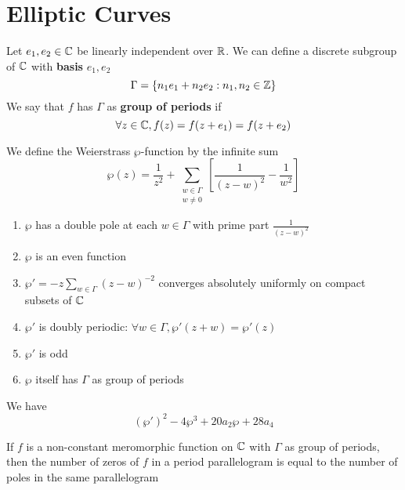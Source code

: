 \documentclass{article}
\begin{document}
\section{Elliptic Curves}

\begin{definition}
  Let \(e_1, e_2 \in \mathbb{C}\) be linearly independent over \(\mathbb{R}\). We can define a discrete subgroup of \(\mathbb{C}\) with \textbf{basis} \(e_1, e_2\)
  \begin{equation}
    \Gamma = \{n_1e_1 + n_2e_2 : n_1, n_2 \in \mathbb{Z}\}
  \end{equation}
  We say that \(f\) has \(\Gamma\) as \textbf{group of periods} if
  \begin{equation}
    \forall z \in \mathbb{C}, f(z) = f(z + e_1) = f(z + e_2)
  \end{equation}
\end{definition}
\begin{definition}
  We define the Weierstrass \(\wp\)-function by the infinite sum
  \begin{equation}\wp(z) = \frac{1}{z^2} + \sum_{\substack{w \in \Gamma \\ w \neq 0}}\left[
    \frac{1}{(z - w)^2} - \frac{1}{w^2}
  \right]\end{equation}
\end{definition}
\begin{claim}
  \begin{enumerate}
    \item \(\wp\) has a double pole at each \(w \in \Gamma\) with prime part \(\frac{1}{(z - w)^2}\)
    \item \(\wp\) is an even function
    \item \(\wp' = -z\sum_{w \in \Gamma}(z - w)^{-2}\) converges absolutely uniformly on compact subsets of \(\mathbb{C}\)
    \item \(\wp'\) is doubly periodic: \(\forall w \in \Gamma, \wp'(z + w) = \wp'(z)\)
    \item \(\wp'\) is odd
    \item \(\wp\) itself has \(\Gamma\) as group of periods
  \end{enumerate}
\end{claim}
We have
\begin{equation}
  (\wp')^2 - 4\wp^3 + 20a_2\wp + 28a_4
\end{equation}

\begin{proposition}
  If \(f\) is a non-constant meromorphic function on \(\mathbb{C}\) with \(\Gamma\) as group of periods, then the number of zeros of \(f\) in a period parallelogram is equal to the number of poles in the same parallelogram
\end{proposition}
\end{document}

